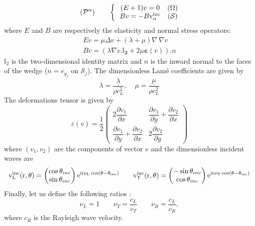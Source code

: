 \begin{equation}
(\mathcal{P}^{\alpha}) \hspace{2em} \left\{~~
\begin{matrix}
(E+1)v=0 & (\Omega) \\
Bv=-B \rm v_{\alpha}^{inc} & (\mathcal{S})
\end{matrix}
\right.
\label{Padim}
\end{equation}
where $E$ and $B$ are respectively the elasticity and normal stress operators:
\begin{gather}
Ev=\mu \Delta v +(\lambda+\mu) \nabla \, \nabla v \label{defE}\\
Bv=(\lambda \nabla v .\mathbf{\mathbb{I}_2}+2\mu \mathbf{\varepsilon} (v)).n\label{defB}
\end{gather}
$\mathbb{I}_2$ is the two-dimensional identity matrix and $n$ is the inward normal to the faces of the wedge ($n=e_{y_j}$ on $\mathcal{S}_j$). The dimensionless Lam\'{e} coefficients are given by
\begin{equation}
\lambda=\frac{\underline{\lambda}}{\rho c_L^2}, \; \; \; \; \mu=\frac{\underline{\mu}}{\rho c_L^2}
\label{LameAdim}
\end{equation}
The deformations tensor is given by 
\begin{equation}
\varepsilon(v)=\dfrac{1}{2}\begin{pmatrix}
2\dfrac{\partial v_1}{\partial x} & \dfrac{\partial v_1}{\partial y}+\dfrac{\partial v_2}{\partial x} \\
\dfrac{\partial v_1}{\partial y}+\dfrac{\partial v_2}{\partial x}& 2\dfrac{\partial v_2}{\partial y}
\end{pmatrix}
\end{equation}
where $(v_1,v_2)$ are the components of vector $v$ and the dimensionless incident waves are
\begin{equation}
\rm v_L^{inc}(r,\theta)=\begin{pmatrix}
\cos \theta_{inc} \\
\sin \theta_{inc}
\end{pmatrix} e^{ir\nu_L \cos(\theta-\theta_{inc})}
\hspace{2em}
\rm v_T^{inc}(r,\theta)=\begin{pmatrix}
-\sin \theta_{inc} \\
\cos \theta_{inc}
\end{pmatrix} e^{ir\nu_T \cos(\theta-\theta_{inc})} 
\end{equation}
Finally, let us define the following ratios :
\begin{equation}
\nu_L=1 \hspace{2em} \nu_T=\frac{c_L}{c_T} \hspace{2em} \nu_R=\frac{c_L}{c_R} ,
\label{nuLnuT}
\end{equation}
where $c_R$ is the Rayleigh wave velocity.

